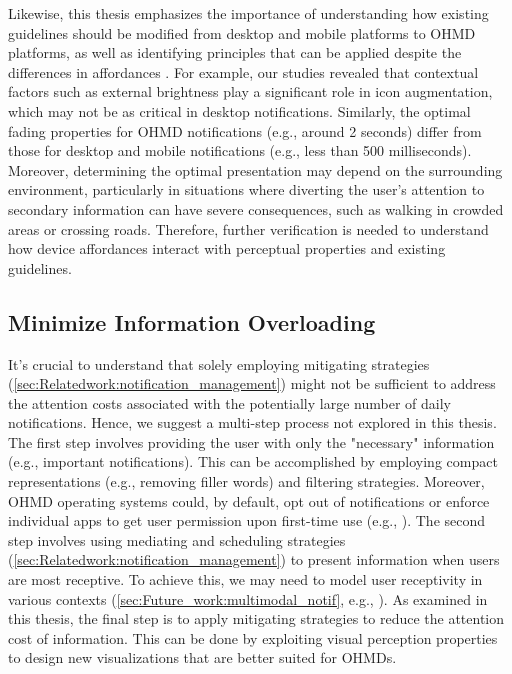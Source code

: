 Likewise, this thesis emphasizes the importance of understanding how existing guidelines should be modified from desktop and mobile platforms to OHMD platforms, as well as identifying principles that can be applied despite the differences in affordances \cite{stephanidis_properties_2015, zhu_bishare_2020, vadas_reading_2006, zhou_ubiquitous_2019}. For example, our studies revealed that contextual factors such as external brightness play a significant role in icon augmentation, which may not be as critical in desktop notifications. Similarly, the optimal fading properties for OHMD notifications (e.g., around 2 seconds) differ from those for desktop and mobile notifications (e.g., less than 500 milliseconds). Moreover, determining the optimal presentation may depend on the surrounding environment, particularly in situations where diverting the user's attention to secondary information can have severe consequences, such as walking in crowded areas or crossing roads. Therefore, further verification is needed to understand how device affordances interact with perceptual properties and existing guidelines.


\subsection{Minimize Information Overloading}

It's crucial to understand that solely employing mitigating strategies (\autoref{sec:Relatedwork:notification_management}) might not be sufficient to address the attention costs associated with the potentially large number of daily notifications. Hence, we suggest a multi-step process not explored in this thesis. The first step involves providing the user with only the "necessary" information (e.g., important notifications). This can be accomplished by employing compact representations (e.g., removing filler words) and filtering strategies. Moreover, OHMD operating systems could, by default, opt out of notifications or enforce individual apps to get user permission upon first-time use (e.g., \cite{westermann_user_2017}). The second step involves using mediating and scheduling strategies (\autoref{sec:Relatedwork:notification_management}) to present information when users are most receptive. To achieve this, we may need to model user receptivity in various contexts (\autoref{sec:Future_work:multimodal_notif}, e.g., \cite{fischer_understanding_2011}). As examined in this thesis, the final step is to apply mitigating strategies to reduce the attention cost of information. This can be done by exploiting visual perception properties to design new visualizations that are better suited for OHMDs.




